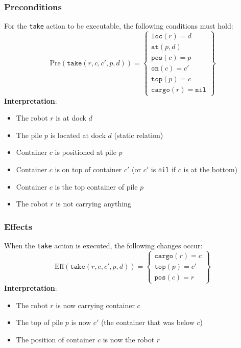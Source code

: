 \documentclass[a4paper]{article}
\theoremstyle{definition}
\begin{document}
\subsubsection{Preconditions}
For the \texttt{take} action to be executable, the following conditions must hold:
\[
  \mathrm{Pre}(\texttt{take}(r,c,c',p,d)) = 
    \left\{
    \begin{array}{l}
        \texttt{loc}(r) = d \\
        \texttt{at}(p,d) \\
        \texttt{pos}(c) = p \\
        \texttt{on}(c) = c' \\
        \texttt{top}(p) = c \\
        \texttt{cargo}(r) = \texttt{nil}
    \end{array}
    \right\}
\]
\textbf{Interpretation}:
\begin{itemize}
    \item The robot \( r \) is at dock \( d \)   
    \item The pile \( p \) is located at dock \( d \) (static relation)
    \item Container \( c \) is positioned at pile \( p \)    
    \item Container \( c \) is on top of container \( c' \) (or \( c' \) is \texttt{nil} if \( c \) is at the bottom)
    \item Container \( c \) is the top container of pile \( p \)    
    \item The robot \( r \) is not carrying anything
\end{itemize}
\subsubsection{Effects}
When the \texttt{take} action is executed, the following changes occur:
\[
  \mathrm{Eff}(\texttt{take}(r,c,c',p,d)) = 
    \left\{
    \begin{array}{l}
        \texttt{cargo}(r) = c \\
        \texttt{top}(p) = c' \\
        \texttt{pos}(c) = r
    \end{array}
    \right\}
\]
\textbf{Interpretation}:
\begin{itemize}
    \item The robot \( r \) is now carrying container \( c \)    
    \item The top of pile \( p \) is now \( c' \) (the container that was below $c$)
    \item The position of container \( c \) is now the robot \( r \)
\end{itemize}
\end{document}
